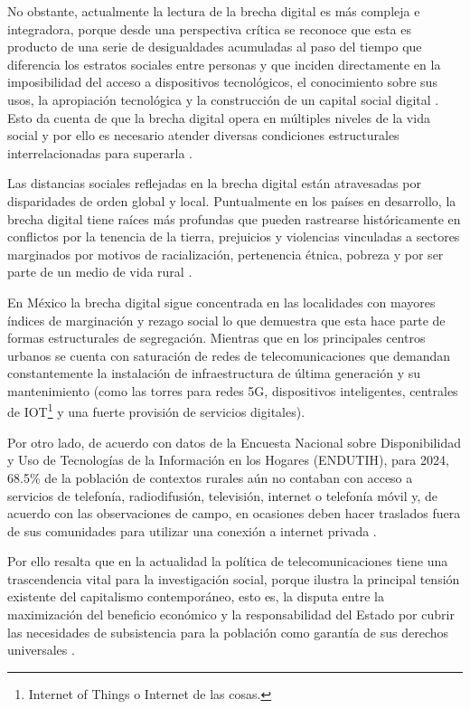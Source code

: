 \documentclass[
  spanish,
  11pt,
  a4paper,
]{scrbook}
\begin{document}
No obstante, actualmente la lectura de la brecha digital es más compleja
e integradora, porque desde una perspectiva crítica se reconoce que esta
es producto de una serie de desigualdades acumuladas al paso del tiempo
que diferencia los estratos sociales entre personas y que inciden
directamente en la imposibilidad del acceso a dispositivos tecnológicos,
el conocimiento sobre sus usos, la apropiación tecnológica y la
construcción de un capital social digital
\autocite{Rogers2001,VanDijk2020}. Esto da cuenta de que la brecha
digital opera en múltiples niveles de la vida social y por ello es
necesario atender diversas condiciones estructurales interrelacionadas
para superarla \autocite{Ragnedda2017}.

Las distancias sociales reflejadas en la brecha digital están
atravesadas por disparidades de orden global y local. Puntualmente en
los países en desarrollo, la brecha digital tiene raíces más profundas
que pueden rastrearse históricamente en conflictos por la tenencia de la
tierra, prejuicios y violencias vinculadas a sectores marginados por
motivos de racialización, pertenencia étnica, pobreza y por ser parte de
un medio de vida rural \autocite{Hilbert2011}.

En México la brecha digital sigue concentrada en las localidades con
mayores índices de marginación y rezago social lo que demuestra que esta
hace parte de formas estructurales de segregación. Mientras que en los
principales centros urbanos se cuenta con saturación de redes de
telecomunicaciones que demandan constantemente la instalación de
infraestructura de última generación y su mantenimiento (como las torres
para redes 5G, dispositivos inteligentes, centrales de IOT\footnote{Internet
  of Things o Internet de las cosas.} y una fuerte provisión de
servicios digitales).

Por otro lado, de acuerdo con datos de la Encuesta Nacional sobre
Disponibilidad y Uso de Tecnologías de la Información en los Hogares
(ENDUTIH), para 2024, 68.5\% de la población de contextos rurales aún no
contaban con acceso a servicios de telefonía, radiodifusión, televisión,
internet o telefonía móvil y, de acuerdo con las observaciones de campo,
en ocasiones deben hacer traslados fuera de sus comunidades para
utilizar una conexión a internet privada \autocite{INEGI2024}.

Por ello resalta que en la actualidad la política de telecomunicaciones
tiene una trascendencia vital para la investigación social, porque
ilustra la principal tensión existente del capitalismo contemporáneo,
esto es, la disputa entre la maximización del beneficio económico y la
responsabilidad del Estado por cubrir las necesidades de subsistencia
para la población como garantía de sus derechos universales
\autocite{Han2014}.
\end{document}
